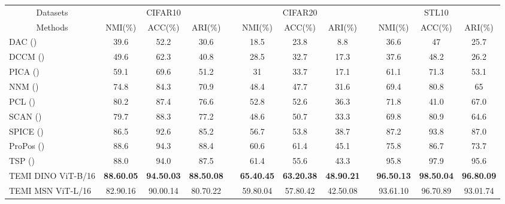 \documentclass{bmvc2k}
\begin{document}
\begin{table*}
	
 \begin{center}
 \begin{adjustbox}{width=1\columnwidth}
		\begin{tabular}{ l c c c c c c c c c c c }
			\toprule
			\multicolumn{1}{c}{Datasets} & \multicolumn{3}{c}{CIFAR10} &      & \multicolumn{3}{c}{CIFAR20} &      & \multicolumn{3}{c}{STL10} \\
			\cmidrule{2-4}\cmidrule{6-8}\cmidrule{10-12}    \multicolumn{1}{c}{Methods} & NMI(\%)  & ACC(\%) & ARI(\%) &      & NMI(\%) & ACC(\%) & ARI(\%) &      & NMI(\%) &ACC(\%)& ARI(\%)\\
\hline
DAC (\citeauthor{chang2017deep}) & 39.6 & 52.2 & 30.6 &      & 18.5 & 23.8 & 8.8  &      & 36.6 & 47   & 25.7 \\ 
DCCM (\citeauthor{wu2019deep}) & 49.6 & 62.3 & 40.8 &      & 28.5 & 32.7 & 17.3 &      & 37.6 & 48.2 & 26.2 \\
PICA (\citeauthor{huang2020deep}) & 59.1 & 69.6 & 51.2 &      & 31   & 33.7 & 17.1 &      & 61.1 & 71.3 & 53.1 \\  
NNM (\citeauthor{dang2021nearest}) & 74.8 & 84.3 & 70.9 &      & 48.4 & 47.7 & 31.6 &      & 69.4 & 80.8 & 65 \\  
PCL (\citeauthor{pcl}) &  80.2 & 87.4 & 76.6        &      & 52.8 & 52.6 & 36.3       &  & 71.8 & 41.0 & 67.0  \\ SCAN (\citeauthor{scan}) & 79.7 &  88.3 & 77.2 &      & 48.6 & 50.7 & 33.3 &      & 69.8 & 80.9 & 64.6 \\
SPICE (\citeauthor{niu2022spice}) & 86.5 &  92.6 & 85.2 &      & 56.7 & 53.8 & 38.7 &      & 87.2 & 93.8 & 87.0 \\
ProPos (\citeauthor{propos})  &  88.6 & 94.3 & 88.4   &      & 60.6 & 61.4 & 45.1   &    & 75.8 & 86.7  & 73.7  \\ TSP (\citeauthor{tsp})  & 88.0 & 94.0 & 87.5 &      &61.4 & 55.6 & 43.3 &      & 95.8 & 97.9 & 95.6 \\ \hline

    
	 TEMI DINO ViT-B/16 & \textbf{88.60.05} &  \textbf{94.50.03} &  \textbf{88.50.08} &      & \textbf{65.40.45} &  \textbf{63.20.38} &  \textbf{48.90.21} &      & \textbf{96.50.13} &  \textbf{98.50.04} &  \textbf{96.80.09} \\

     TEMI MSN ViT-L/16 & 82.90.16 &  90.00.14 &  80.70.22 &      & 59.80.04 &  57.80.42 &  42.50.08 &      & 93.61.10 &  96.70.89 &  93.01.74 \\
     

\end{tabular}
\end{adjustbox}
\end{center}
\end{table*}
\end{document}
